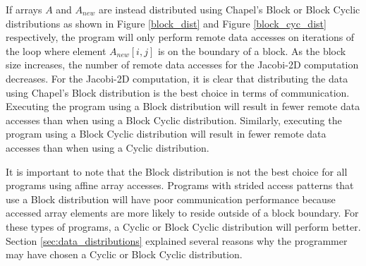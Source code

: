 If arrays $A$ and $A_{new}$ are instead distributed using Chapel's Block or Block Cyclic distributions as shown in Figure \ref{block_dist} and Figure \ref{block_cyc_dist} respectively, the program will only perform remote data accesses on iterations of the loop where element $A_{new}[i, j]$ is on the boundary of a block. As the block size increases, the number of remote data accesses for the Jacobi-2D computation decreases. For the Jacobi-2D computation, it is clear that distributing the data using Chapel's Block distribution is the best choice in terms of communication. Executing the program using a Block distribution will result in fewer remote data accesses than when using a Block Cyclic distribution. Similarly, executing the program using a Block Cyclic distribution will result in fewer remote data accesses than when using a Cyclic distribution. 

It is important to note that the Block distribution is not the best choice for all programs using affine array accesses. Programs with strided access patterns that use a Block distribution will have poor communication performance because accessed array elements are more likely to reside outside of a block boundary. For these types of programs, a Cyclic or Block Cyclic distribution will perform better. Section \ref{sec:data_distributions} explained several reasons why the programmer may have chosen a Cyclic or Block Cyclic distribution.

